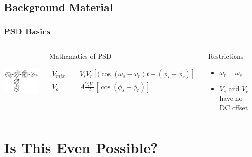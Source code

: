 \documentclass{beamer}
\begin{document}
\subsection{Background Material}
\begin{frame}
\frametitle{PSD Basics}


\begin{columns}[t]
	\column[c]{4.5cm}
	    \includegraphics[height=3.2cm]{PSD_block}
	\column[c]{6.6cm}
\small	
	\begin{block}{Mathematics of PSD}
	
	\begin{align*}
	V_{mix}&=V_s V_r \left [ ( \cos\left(\omega_s-\omega_r\right)t-(\phi_s-\phi_r)\right]\\
	V_o&=A \frac{V_s V_r}{2} \left[ \cos(\phi_s-\phi_r)\right]
	\end{align*}
	
	\end{block}

\begin{block}{Restrictions}
\begin{itemize}
\item $\omega_r=\omega_s$
\item\alert{ $V_s$ and $V_r$ have no DC offset}
\end{itemize}
\end{block}

\end{columns}
\end{frame}

\section{Is This Even Possible?}
\end{document}
